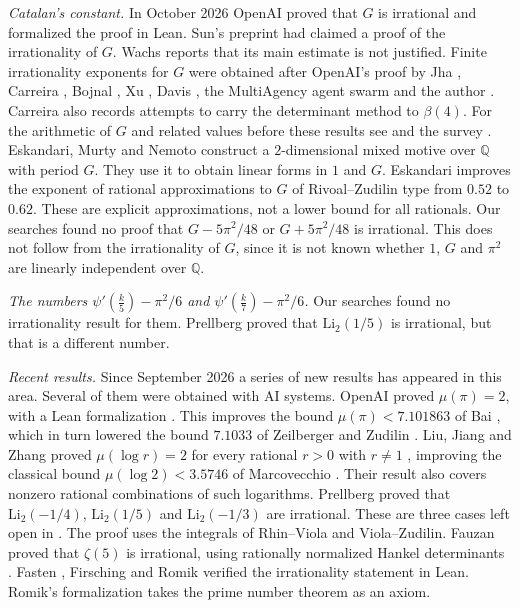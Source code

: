 \documentclass[11pt]{amsart}
\theoremstyle{definition}
\theoremstyle{remark}
\numberwithin{equation}{section}
\newcommand{\Q}{\mathbb Q}
\begin{document}
\emph{Catalan's constant.} In October 2026 OpenAI \cite{OpenAI2026} proved that $G$ is irrational and formalized the
proof in Lean. Sun's preprint \cite{Sun2026} had claimed a proof of the irrationality of $G$. Wachs \cite{Wachs2026}
reports that its main estimate is not justified. Finite irrationality exponents for $G$ were obtained after OpenAI's
proof by Jha \cite{Jha2026}, Carreira \cite{Carreira2026}, Bojnal \cite{Bojnal2026}, Xu \cite{Xu2026}, Davis \cite{Davis2026}, the MultiAgency agent swarm
\cite{MultiAgency2026} and the author
\cite{Litsey2026}. Carreira \cite{Carreira2026b} also records attempts to carry the determinant method to $\beta(4)$. For
the arithmetic of $G$ and related values before these results see
\cite{RivoalZudilin2003,Zudilin2003,Zudilin02Cheb,KrattRivoal08,KrattZudilin19} and the survey \cite{Zudilin19Survey}.
Eskandari, Murty and Nemoto \cite{EMN2025} construct a $2$-dimensional mixed motive over $\Q$ with period $G$. They use
it to obtain linear forms in $1$ and $G$. Eskandari \cite{Eskandari2026} improves the exponent of rational approximations
to $G$ of Rivoal--Zudilin type from $0.52$ to $0.62$. These are explicit approximations, not a lower bound for all
rationals. Our searches found no proof that $G-5\pi^2/48$ or $G+5\pi^2/48$ is irrational. This does not follow from the
irrationality of $G$, since it is not known whether $1$, $G$ and $\pi^2$ are linearly independent over $\Q$.

\emph{The numbers $\psi'(\frac k5)-\pi^2/6$ and $\psi'(\frac k7)-\pi^2/6$.} Our searches found no irrationality result for
them. Prellberg \cite{Prellberg26} proved that $\mathrm{Li}_2(1/5)$ is irrational, but that is a different number.

\emph{Recent results.} Since September 2026 a series of new results has appeared in this area. Several of them were
obtained with AI systems. OpenAI proved $\mu(\pi)=2$, with a Lean formalization \cite{OpenAIPi2026}. This improves the
bound $\mu(\pi)<7.101863$ of Bai \cite{Bai26}, which in turn lowered the bound $7.1033$ of Zeilberger and Zudilin
\cite{ZeilbergerZudilin20}. Liu, Jiang and Zhang proved $\mu(\log r)=2$
for every rational $r>0$ with $r\ne1$ \cite{LiuJiangZhang26}, improving the classical bound $\mu(\log2)<3.5746$ of
Marcovecchio \cite{Marcovecchio09}. Their result also covers nonzero rational combinations of such logarithms. Prellberg
\cite{Prellberg26} proved that $\mathrm{Li}_2(-1/4)$, $\mathrm{Li}_2(1/5)$ and $\mathrm{Li}_2(-1/3)$ are irrational. These
are three cases left open in \cite{CDT2024}. The proof uses the integrals of Rhin--Viola and Viola--Zudilin. Fauzan
proved that $\zeta(5)$ is irrational, using rationally normalized Hankel determinants \cite{Fauzan2026}. Fasten \cite{Fasten26}, Firsching \cite{Firsching26} and Romik \cite{Romik26}
verified the irrationality statement in Lean. Romik's formalization takes the prime number theorem as an axiom.
\end{document}
